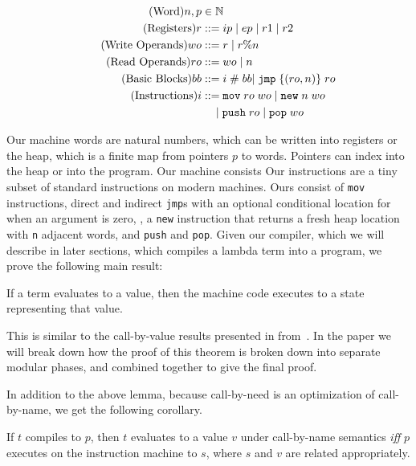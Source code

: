 \begin{align}
  \tag{Word}   n, p &\in \mathbb{N} \\
  \tag{Registers} r &::= ip \; | \; ep \; | \; r1 \; | \; r2  \\
  \tag{Write Operands}  wo &::= r \; | \; r\%n \\
  \tag{Read Operands}  ro &::= wo \; | \; n \\
  \tag{Basic Blocks} bb &::= i \; \# \; bb
                       | \; \texttt{jmp} \; \{(ro, n)\} \; ro \;  \\
  \tag{Instructions} i &::= \texttt{mov} \; ro \; wo \; 
                       | \; \texttt{new} \; n \; wo \; \\
  \notag   & \quad \;  | \; \texttt{push} \; ro \; 
                       | \; \texttt{pop} \; wo \\
\end{align}

Our machine words are natural numbers, which can be written into registers or
the heap, which is a finite map from pointers $p$ to words. Pointers can index
into the heap or into the program. Our machine consists Our instructions are a tiny subset of
standard instructions on modern machines. Ours consist of \texttt{mov}
instructions, direct and indirect \texttt{jmp}s with an optional conditional
location for when an argument is zero, , a \texttt{new} instruction that
returns a fresh heap location with \texttt{n} adjacent words, and \texttt{push}
and \texttt{pop}. Given our compiler, which we will describe in later sections,
which compiles a lambda term into a program, we prove the following main
result:

\begin{theorem}
If a term evaluates to a value, then the machine code executes to a state
representing that value. 
\end{theorem}

This is similar to the call-by-value results presented in
from~\cite{chlipala2007certified}. In the paper we will break down how the proof
of this theorem is broken down into separate modular phases, and combined
together to give the final proof. 

In addition to the above lemma, because call-by-need is an optimization of
call-by-name, we get the following corollary.

\begin{corollary}
If $t$ compiles to $p$, then $t$ evaluates to a value $v$ under call-by-name
semantics \emph{iff} $p$ executes on the instruction machine to $s$, where $s$
and $v$ are related appropriately.
\end{corollary}

